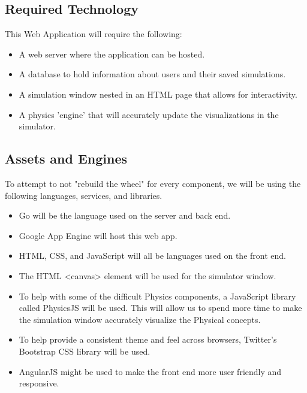 \subsection{Required Technology}
\iffalse
List and describe the software technologies that you will either need to implement or utilize to realize your project goals.
\fi

This Web Application will require the following:
\begin{itemize}
\item A web server where the application can be hosted.
\item A database to hold information about users and their saved simulations.
\item A simulation window nested in an HTML page that allows for interactivity.
\item A physics 'engine' that will accurately update the visualizations in the simulator.
\end{itemize}

\subsection{Assets and Engines}
\iffalse
How much will you be building from scratch? What resources/assets will you leverage? Where will they come from?
\fi

To attempt to not "rebuild the wheel" for every component, we will be using the following languages, services, and libraries.
\begin{itemize}
\item Go will be the language used on the server and back end.
\item Google App Engine will host this web app.
\item HTML, CSS, and JavaScript will all be languages used on the front end.
\item The HTML {\textless}canvas{\textgreater} element will be used for the simulator window.
\item To help with some of the difficult Physics components, a JavaScript library called PhysicsJS will be used. This will allow us to spend more time to make the simulation window accurately visualize the Physical concepts.
\item To help provide a consistent theme and feel across browsers, Twitter's Bootstrap CSS library will be used.
\item AngularJS might be used to make the front end more user friendly and responsive.
\end{itemize}


